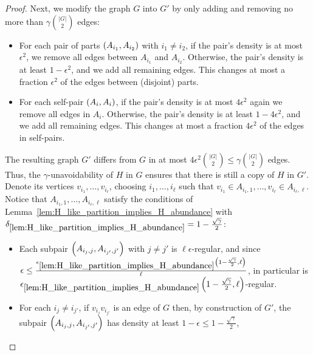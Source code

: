 \begin{theorem}
\begin{proof}
            Next, we modify the graph $G$ into $G'$ by only adding and removing no more than $\gamma {|G| \choose 2}$
            edges:
            \begin{itemize}
                \item For each pair of parts $\left( A_{i_1}, A_{i_2} \right)$ with $i_1 \neq i_2$, if the pair's density is
                    at most $\epsilon^2$, we remove all edges between $A_{i_1}$ and $A_{i_2}$.
                    Otherwise, the pair's density is at least $1 - \epsilon^2$, and we add all remaining edges.
                    This changes at most a fraction $\epsilon^2$ of the edges between (disjoint) parts.
                \item For each self-pair $\left( A_i, A_i \right)$, if the pair's density is at most $4 \epsilon^2$ again we
                    remove all edges in $A_i$.
                    Otherwise, the pair's density is at least $1 - 4 \epsilon^2$, and we add all remaining edges.
                    This changes at most a fraction $4 \epsilon^2$ of the edges in self-pairs.
            \end{itemize}
            The resulting graph $G'$ differs from $G$ in at most $4 \epsilon^2 {|G| \choose 2} \leq \gamma {|G| \choose 2}$
            edges.
            Thus, the $\gamma$-unavoidability of $H$ in $G$ ensures that there is still a copy of $H$ in $G'$.
            Denote its vertices $v_{i_1}, \dots, v_{i_\ell}$, choosing $i_1, \dots, i_\ell$ such that
            $v_{i_1} \in A_{i_1,1}, \dots, v_{i_\ell} \in A_{i_\ell, \ell}$.
            Notice that $A_{i_1,1}, \dots, A_{i_\ell, \ell}$ satisfy the conditions of Lemma~\ref{lem:H_like_partition_implies_H_abundance}
            with $\delta_{\ref{lem:H_like_partition_implies_H_abundance}} = 1 - \frac{\sqrt{\gamma}}{2}$:
            \begin{itemize}
                \item Each subpair $\left( A_{i_j, j}, A_{i_{j'}, j'} \right)$ with $j \neq j'$ is $\ell \epsilon$-regular,
                    and since $\epsilon \leq \frac{\epsilon_{\ref{lem:H_like_partition_implies_H_abundance}} \left( 1 - \frac{\sqrt{\gamma}}{2}, \ell \right)}{\ell}$,
                    in particular is $\epsilon_{\ref{lem:H_like_partition_implies_H_abundance}} \left( 1 - \frac{\sqrt{\gamma}}{2}, \ell \right)$-regular.
                \item For each $i_j \neq i_{j'}$, if $v_{i_j} v_{i_{j'}}$ is an edge of $G$ then, by construction of $G'$,
                    the subpair $\left( A_{i_j, j}, A_{i_{j'}, j'} \right)$ has density at least $1 - \epsilon \leq 1 - \frac{\sqrt{\gamma}}{2}$,

\end{itemize}
\end{proof}
\end{theorem}
